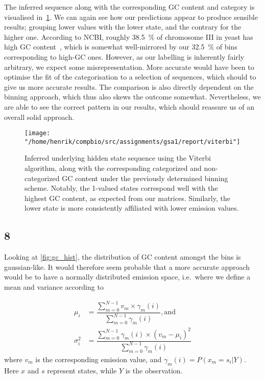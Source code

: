 \documentclass[10pt]{article}\usepackage[]{graphicx}\usepackage[]{color}
\theoremstyle{plain}
\begin{document}
The inferred sequence along with the corresponding GC content and category is visualised in~\cref{fig:viterbi}. We can again see how our predictions appear to produce sensible results; grouping lower values with the lower state, and the contrary for the higher one. According to NCBI, roughly 38.5~\% of chromosome III in yeast has high GC content~\cite{gc_cont}, which is somewhat well-mirrored by our 32.5~\% of bins corresponding to high-GC ones. However, as our labelling is inherently fairly arbitrary, we expect some misrepresentation. More accurate would have been to optimise the fit of the categorisation to a selection of sequences, which should to give us more accurate results. The comparison is also directly dependent on the binning approach, which thus also skews the outcome somewhat. Nevertheless, we are able to see the correct pattern in our results, which should reassure us of an overall solid approach.

\begin{figure}[H]
  \centering
  \texttt{[image: "/home/henrik/compbio/src/assignments/gsa1/report/viterbi"]}
  \caption{Inferred underlying hidden state sequence using the Viterbi algorithm, along with the corresponding categorized and non-categorized GC content under the previously determined binning scheme. Notably, the 1-valued states correspond well with the highest GC content, as expected from our matrices. Similarly, the lower state is more consistently affiliated with lower emission values.}
  \label{fig:viterbi}
\end{figure}

\subsection*{8}
Looking at \cref{fig:gc_hist}, the distribution of GC content amongst the bins is gaussian-like. It would therefore seem probable that a more accurate approach would be to have a normally distributed emission space, i.e.\ where we define a mean and variance according to

\begin{align*}
\displaystyle
  \mu_i &= \dfrac{\sum_{m=0}^{N-1} v_m \times \gamma_m(i)}{\sum_{m=0}^{N-1} \gamma_m(i)}, \text{and} \\
  \sigma_i^2 &= \dfrac{\sum_{m=0}^{N-1} \gamma_m(i) \times (v_m - \mu_i)^2}{\sum_{m=0}^{N-1} \gamma_m(i)}
\end{align*}
where $v_m$ is the corresponding emission value, and $\gamma_m(i) = P(x_m=s_i | Y)$. Here $x$ and $s$ represent states, while $Y$ is the observation. 
\end{document}
